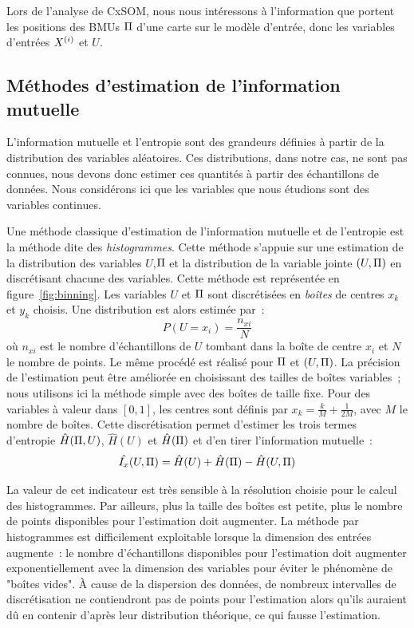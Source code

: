 \documentclass[../main]{subfiles}
\begin{document}
Lors de l'analyse de CxSOM, nous nous intéressons à l'information que portent les positions des BMUs $\Pi$ d'une carte sur le modèle d'entrée, donc les variables d'entrées $X^{({i})}$ et $U$.

\subsection{Méthodes d'estimation de l'information mutuelle}

L'information mutuelle et l'entropie sont des grandeurs définies à partir de la distribution des variables aléatoires. Ces distributions, dans notre cas, ne sont pas connues, nous devons donc estimer ces quantités à partir des échantillons de données. Nous considérons ici que les variables que nous étudions sont des variables continues.

Une méthode classique d'estimation de l'information mutuelle et de l'entropie est la méthode dite des \emph{histogrammes}.
Cette méthode s'appuie sur une estimation de la distribution des variables $U$,$\Pi$ et la distribution de la variable jointe $(U,\Pi)$ en discrétisant chacune des variables.
Cette méthode est représentée en figure~\ref{fig:binning}. Les variables $U$ et $\Pi$ sont discrétisées en \emph{boîtes} de centres $x_k$ et $y_k$ choisis.
Une distribution est alors estimée par~: 
$$P(U = x_i) = \frac{n_{xi}}{N} $$ où $n_{xi}$ est le nombre d'échantillons de $U$ tombant dans la boîte de centre $x_i$ et $N$ le nombre de points. Le même procédé est réalisé pour $\Pi$ et $(U,\Pi)$. La précision de l'estimation peut être améliorée en choisissant des tailles de boîtes variables~; nous utilisons ici la méthode simple avec des boîtes de taille fixe.
Pour des variables à valeur dans $[0,1]$, les centres sont définis par $x_k = \frac{k}{M}+\frac{1}{2M}$, avec $M$ le nombre de boîtes.
Cette discrétisation permet d'estimer les trois termes d'entropie $\hat{H}(\Pi,U)$, $\hat{H}(U)$ et $\hat{H}(\Pi)$ et d'en tirer l'information mutuelle~:
\begin{equation}
    \hat{I_x}(U,\Pi) = \hat{H}(U) + \hat{H}(\Pi) - \hat{H}(U,\Pi)
   \end{equation}

La valeur de cet indicateur est très sensible à la résolution choisie pour le calcul des histogrammes.
Par ailleurs, plus la taille des boîtes est petite, plus le nombre de points disponibles pour l'estimation doit augmenter.
La méthode par histogrammes est difficilement exploitable lorsque la dimension des entrées augmente~:
le nombre d'échantillons disponibles pour l'estimation doit augmenter exponentiellement avec la dimension des variables pour éviter le phénomène de "boîtes vides". \`A cause de la dispersion des données, de nombreux intervalles de discrétisation ne contiendront pas de points pour l'estimation alors qu'ils auraient dû en contenir d'après leur distribution théorique, ce qui fausse l'estimation.
\end{document}
